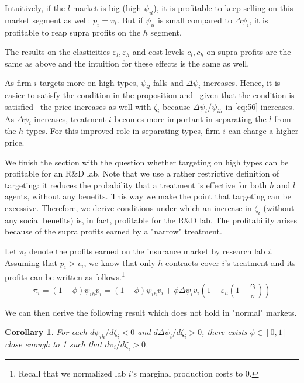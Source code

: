 \documentclass[a4paper,12pt]{article}
\newtheorem{corollary}{Corollary}
\begin{document}
Intuitively, if the \(l\) market is big (high \(\psi_{il}\)), it is profitable to keep selling on this market segment as well: \(p_i = v_i\). But if \(\psi_{il}\) is small compared to \(\Delta \psi_i\), it is profitable to reap supra profits on the \(h\) segment.

The results on the elasticities \(\varepsilon_l, \varepsilon_h\) and cost levels \(c_l,c_h\) on supra profits are the same as above and the intuition for these effects is the same as well.

As firm \(i\) targets more on high types, \(\psi_{il}\) falls and \(\Delta \psi_i\) increases. Hence, it is easier to satisfy the condition in the proposition and --given that the condition is satisfied-- the price increases as well with \(\zeta_i\) because \(\Delta \psi_{i}/\psi_{ih}\) in \eqref{eq:56} increases. As \(\Delta \psi_i\) increases, treatment \(i\) becomes more important in separating the \(l\) from the \(h\) types. For this improved role in separating types, firm \(i\) can charge a higher price.

We finish the section with the question whether targeting on high types can be profitable for an R\&D lab. Note that we use a rather restrictive definition of targeting: it reduces the probability that a treatment is effective for both \(h\) and \(l\) agents, without any benefits. This way we make the point that targeting can be excessive. Therefore, we derive conditions under which an increase in \(\zeta_i\) (without any social benefits) is, in fact, profitable for the R\&D lab. The profitability arises because of the supra profits earned by a "narrow" treatment.

Let \(\pi_i\) denote the profits earned on the insurance market by research lab \(i\). Assuming that \(p_i>v_i\), we know that only \(h\) contracts cover \(i\)'s treatment and its profits can be written as follows.\footnote{Recall that we normalized lab \(i\)'s marginal production costs to 0.}
\begin{equation}
\label{eq:38}
\pi_i = (1-\phi)\psi_{ih}p_i=(1-\phi)\psi_{ih}v_i+\phi\Delta\psi_iv_i (1-\varepsilon_h(1-\frac{c_l}{\sigma}))
\end{equation}

We can then derive the following result which does not hold in "normal" markets.

\begin{corollary}
\label{Targeting_profitable}
For each \(d\psi_{ih}/d\zeta_i<0\) and \(d\Delta\psi_i/d\zeta_i>0\), there exists \(\phi \in [0,1]\) close enough to 1 such that \(d\pi_i/d\zeta_i>0\).
\end{corollary}
\end{document}
